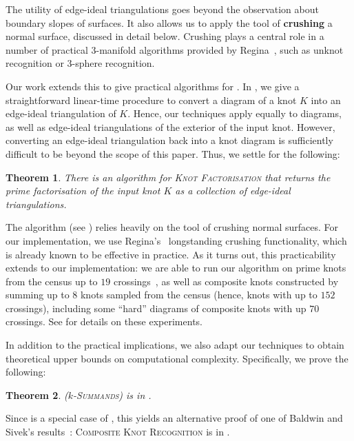 \documentclass[10pt,a4paper]{amsart}
\newtheorem{theorem}{Theorem}
\begin{document}
The utility of edge-ideal triangulations goes beyond the observation about boundary slopes of surfaces.
It also allows us to apply the tool of \textbf{crushing} a normal surface, discussed in detail below. Crushing plays a central role in a number of practical $3$-manifold algorithms provided by Regina~\cite{burton2013regina,burton2014crushing,Regina}, such as unknot recognition or $3$-sphere recognition.

Our work extends this to give practical algorithms for .
In , we give a straightforward linear-time procedure to convert
a diagram of a knot $K$ into an edge-ideal triangulation of $K$. Hence, our techniques
apply equally to diagrams, as well as edge-ideal triangulations of the exterior of the
input knot. However, converting an edge-ideal triangulation back into a knot diagram is
sufficiently difficult to be beyond the scope of this paper. Thus, we settle for the following:

\begin{theorem}\label{thm:summandsAlgo}
There is an algorithm  for \textup{\textsc{Knot Factorisation}} that
returns the prime factorisation of the input knot $K$ as a collection of edge-ideal triangulations.
\end{theorem}

The algorithm (see ) relies heavily on the tool of crushing normal surfaces.
For our implementation, we use Regina's~\cite{Regina} longstanding crushing functionality, which is already known to be effective in practice.
As it turns out, this practicability extends to our implementation: we are able to run our algorithm on prime knots from the census up to $19$ crossings~\cite{burton2020knots},
as well as composite knots constructed by summing up to $8$ knots sampled from the census (hence, knots with up to $152$ crossings), including some ``hard'' diagrams of composite knots with up $70$ crossings.
See  for details on these experiments.

In addition to the practical implications, we also adapt our techniques to obtain theoretical upper bounds on computational complexity. Specifically, we prove the following:


\begin{theorem}\label{thm:summandsNP}
 ($k$\textup{-\textsc{Summands}}) is in \NP.
\end{theorem}


Since  is a special case of , this yields an alternative proof of one of Baldwin and Sivek's results~\cite[Theorem~7.3]{baldwin2019complexity}:
\textsc{Composite Knot Recognition} is in \NP.
\end{document}
